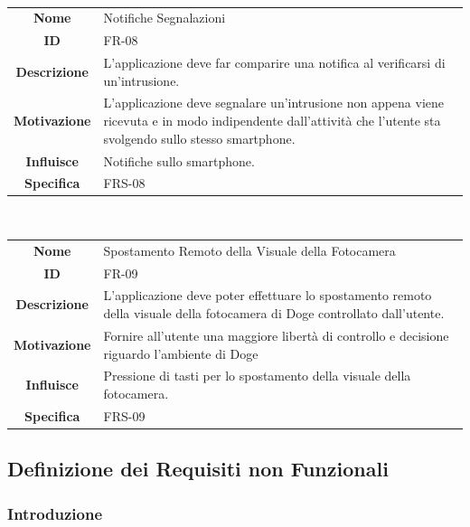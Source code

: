 \documentclass{article}
\begin{document}
    ~
    
    \begin{adjustbox}{center}
    \begin{tabular}{|c|p{10cm}|}
    \hline
    \textbf{Nome} & Notifiche Segnalazioni \\
    \textbf{ID} & FR-08 \\
    \textbf{Descrizione} & L'applicazione deve far comparire una notifica al verificarsi di un'intrusione. \\
    \textbf{Motivazione} & L'applicazione deve segnalare un'intrusione non appena viene ricevuta e in modo indipendente dall'attività che l'utente sta svolgendo sullo stesso smartphone. \\
    \textbf{Influisce} & Notifiche sullo smartphone. \\
    \textbf{Specifica} & FRS-08 \\
    \hline
    \end{tabular}
    \end{adjustbox}
    
    ~
    
    \begin{adjustbox}{center}
    \begin{tabular}{|c|p{10cm}|}
    \hline
    \textbf{Nome} & Spostamento Remoto della Visuale della Fotocamera \\
    \textbf{ID} & FR-09 \\
    \textbf{Descrizione} & L'applicazione deve poter effettuare lo spostamento remoto della visuale della fotocamera di Doge controllato dall'utente. \\
    \textbf{Motivazione} & Fornire all'utente una maggiore libertà di controllo e decisione riguardo l'ambiente di Doge \\
    \textbf{Influisce} & Pressione di tasti per lo spostamento della visuale della fotocamera. \\
    \textbf{Specifica} & FRS-09 \\
    \hline
    \end{tabular}
    \end{adjustbox}
    
    \subsection{Definizione dei Requisiti non Funzionali}
    
    \subsubsection{Introduzione}
    
\end{document}
